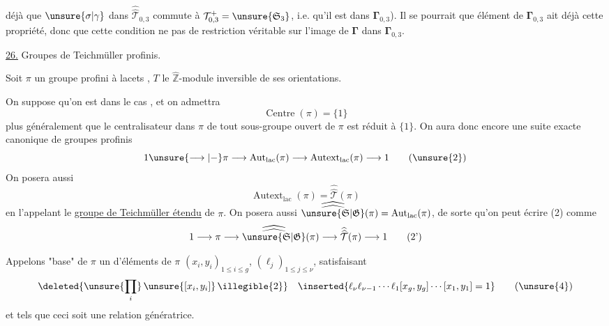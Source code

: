 

déjà que $\unsure{\sigma|\gamma}$ dans $\widehat{\widehat{\mathcal{T}}}_{0,3}$ commute à $\mathcal{T}^{+}_{0,3}=\unsure{\mathfrak{S}_{3}}$,  i.e. qu'il est dans $\boldsymbol{\Gamma}_{0,3}$). Il se pourrait que  élément de $\boldsymbol{\Gamma}_{0,3}$ ait déjà cette propriété, donc que cette condition ne  pas de restriction véritable sur l'image de $\boldsymbol{\Gamma}$ dans $\boldsymbol{\Gamma}_{0,3}$.



\uline{26.} Groupes de Teichmüller profinis.


Soit $\pi$ un groupe profini à lacets , $T$ le $\widehat{\mathbb Z}$-module inversible de ses orientations.

On suppose qu'on est dans le cas , et on admettra 
\[
\operatorname{Centre}(\pi)=\{1\}
\tag{1}
\]
plus généralement que le centralisateur dans $\pi$ de tout sous-groupe ouvert de $\pi$ est réduit à $\{1\}$. On aura donc encore une suite exacte canonique de groupes profinis
\[
1 \unsure{\longrightarrow|{-}} \pi \longrightarrow \operatorname{Aut}_{\mathrm{lac}}(\pi) \longrightarrow \operatorname{Autext}_{\mathrm{lac}}(\pi) \longrightarrow 1
\tag{\unsure{2}}
\]
On posera aussi 
\[
\operatorname{Autext}_{\mathrm{lac}}(\pi)=\widehat{\widehat{\mathcal T}}(\pi)
\tag{3}
\]
en l'appelant le \uline{groupe de Teichmüller étendu} de $\pi$. On posera aussi $\widehat{\widehat{\unsure{\mathfrak S|\mathfrak G}}}(\pi)=\operatorname{Aut}_{\mathrm{lac}}(\pi)$, de sorte qu'on peut écrire (2) comme
\[
1 \longrightarrow \pi \longrightarrow \widehat{\widehat{\unsure{\mathfrak S|\mathfrak G}}}(\pi) \longrightarrow \widehat{\widehat{\mathcal T}}(\pi) \longrightarrow 1
\tag{2'}
\]

Appelons "base" de $\pi$ un  d'éléments de $\pi$ $(x_i,y_i)_{1\leq i\leq g}$, $(\ell_j)_{1\leq j\leq\nu}$,  satisfaisant
\[
\deleted{\unsure{\prod_i}\,\unsure{[x_i,y_i]}\,\illegible{2}}
\quad
\inserted{\ell_\nu\ell_{\nu-1}\cdots\ell_1[x_g,y_g]\cdots[x_1,y_1]=1}
\tag{\unsure{4}}
\]
et tels que ceci soit une relation génératrice.

